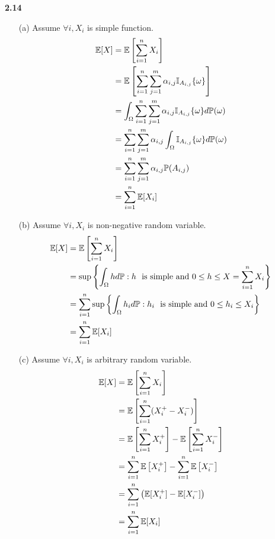 \noindent\textbf{2.14}
\begin{enumerate}
\item[(a)] Assume $\forall i, X_i$ is simple function.
    \begin{align}
        \mathbb{E}[X]&=\mathbb{E}\left[{\sum^{n}_{i=1} X_i}\right] \notag \\
        &=\mathbb{E}\left[\sum^{n}_{i=1}\sum^{m}_{j=1}\alpha_{i,j}\mathbb{I}_{A_{i,j}}\{\omega \}\right]\notag \\
        &=\int_{\Omega}\sum^{n}_{i=1}\sum^{m}_{j=1}\alpha_{i,j}\mathbb{I}_{A_{i,j}}\{\omega\} d\mathbb{P}(\omega)\notag \\
        &=\sum^{n}_{i=1}\sum^{m}_{j=1}\alpha_{i,j}\int_{\Omega}\mathbb{I}_{A_{i,j}}\{\omega\} d\mathbb{P}(\omega)\notag \\
        &=\sum^{n}_{i=1}\sum^{m}_{j=1}\alpha_{i,j}\mathbb{P}(A_{i,j})\notag \\
        &=\sum^{n}_{i=1}\mathbb{E}[X_i]\notag
    \end{align}
\item[(b)] Assume $\forall i, X_i$ is non-negative random variable.
    \begin{align}
        \mathbb{E}[X]&=\mathbb{E}\left[\sum^{n}_{i=1}X_i\right]\notag \\
        &=\sup\left\{\int_{\Omega}hd\mathbb{P}:{h \ \text{ is simple and} }\ 0\leq h\leq X=\sum^{n}_{i=1}X_i \right\}\notag \\
        &=\sum^{n}_{i=1}\sup\left\{\int_{\Omega}h_id\mathbb{P}:{h_i \ \text{ is simple and} }\ 0\leq h_i\leq X_i \right\}\notag \\
        &=\sum^{n}_{i=1}\mathbb{E}[X_i]\notag
    \end{align}
\item[(c)] Assume $\forall i, X_i$ is arbitrary random variable.
    \begin{align}
        \mathbb{E}[X]&=\mathbb{E}\left[\sum^{n}_{i=1}X_i\right]\notag\\
        &=\mathbb{E}\left[\sum^{n}_{i=1}(X^+_i-X^-_i)\right]\notag\\
        &=\mathbb{E}\left[\sum^n_{i=1}X^+_i\right]-\mathbb{E}\left[\sum^n_{i=1}X^-_i\right]\notag\\
        &=\sum^n_{i=1}\mathbb{E}\left[X^+_i\right]-\sum^n_{i=1}\mathbb{E}\left[X^-_i\right]\notag\\
        &=\sum^n_{i=1}\left(\mathbb{E}[X^+_i]-\mathbb{E}[X^-_i] \right)\notag\\
        &=\sum^n_{i=1}\mathbb{E}[X_i]\notag
    \end{align}
\end{enumerate}

